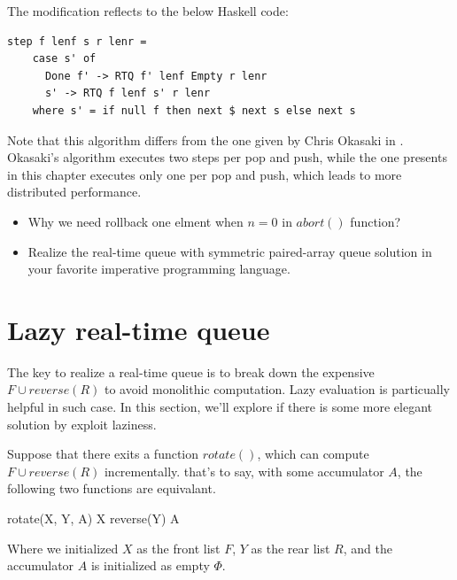 \documentclass{article}
\begin{document}
The modification reflects to the below Haskell code:

\lstset{language=Haskell}
\begin{lstlisting}
step f lenf s r lenr =
    case s' of 
      Done f' -> RTQ f' lenf Empty r lenr
      s' -> RTQ f lenf s' r lenr
    where s' = if null f then next $ next s else next s
\end{lstlisting} %

Note that this algorithm differs from the one given by Chris Okasaki in \cite{okasaki-book}.
Okasaki's algorithm executes two steps per pop and push, while the one presents in 
this chapter executes only one per pop and push, which leads to more distributed
performance.

\begin{Exercise}
\begin{itemize}
\item Why we need rollback one elment when $n=0$ in $abort()$ function?

\item Realize the real-time queue with symmetric paired-array queue solution in your favorite 
imperative programming language.
\end{itemize}
\end{Exercise}


\section{Lazy real-time queue}

The key to realize a real-time queue is to break down the expensive
$F \cup reverse(R)$ to avoid monolithic computation. Lazy evaluation
is particually helpful in such case. In this section, we'll explore
if there is some more elegant solution by exploit laziness.

Suppose that there exits a function $rotate()$,
which can compute $F \cup reverse(R)$ incrementally. that's to say,
with some accumulator $A$, the following two functions are equivalant.

\be
  rotate(X, Y, A) \equiv X \cup reverse(Y) \cup A
  \label{eq:rot-def}
\ee

Where we initialized $X$ as the front list $F$, $Y$ as the rear list $R$,
and the accumulator $A$ is initialized as empty $\Phi$.
\end{document}
